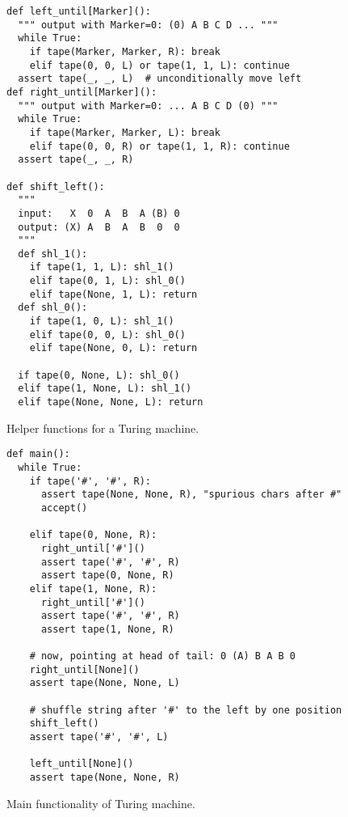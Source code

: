 \documentclass[a4paper]{article}
\begin{document}
\begin{figure}

\begin{verbatim}
def left_until[Marker]():
  """ output with Marker=0: (0) A B C D ... """
  while True:
    if tape(Marker, Marker, R): break
    elif tape(0, 0, L) or tape(1, 1, L): continue
  assert tape(_, _, L)  # unconditionally move left
def right_until[Marker]():
  """ output with Marker=0: ... A B C D (0) """
  while True:
    if tape(Marker, Marker, L): break
    elif tape(0, 0, R) or tape(1, 1, R): continue
  assert tape(_, _, R)

def shift_left():
  """
  input:   X  0  A  B  A (B) 0
  output: (X) A  B  A  B  0  0
  """
  def shl_1():
    if tape(1, 1, L): shl_1()
    elif tape(0, 1, L): shl_0()
    elif tape(None, 1, L): return
  def shl_0():
    if tape(1, 0, L): shl_1()
    elif tape(0, 0, L): shl_0()
    elif tape(None, 0, L): return

  if tape(0, None, L): shl_0()
  elif tape(1, None, L): shl_1()
  elif tape(None, None, L): return
\end{verbatim}
  \caption{Helper functions for a Turing machine.}\label{fig:tm1}
\end{figure}


\begin{figure}

  \begin{verbatim}
def main():
  while True:
    if tape('#', '#', R):
      assert tape(None, None, R), "spurious chars after #"
      accept()

    elif tape(0, None, R):
      right_until['#']()
      assert tape('#', '#', R)
      assert tape(0, None, R)
    elif tape(1, None, R):
      right_until['#']()
      assert tape('#', '#', R)
      assert tape(1, None, R)

    # now, pointing at head of tail: 0 (A) B A B 0
    right_until[None]()
    assert tape(None, None, L)

    # shuffle string after '#' to the left by one position
    shift_left()
    assert tape('#', '#', L)

    left_until[None]()
    assert tape(None, None, R)
\end{verbatim}

  \caption{Main functionality of Turing machine.}\label{fig:tm2}
\end{figure}
\end{document}

